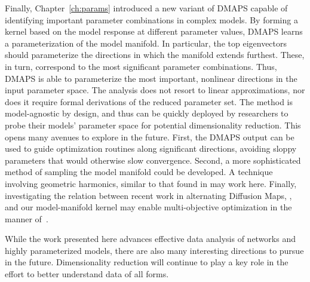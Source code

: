 Finally, Chapter~\ref{ch:params} introduced a new variant of DMAPS
capable of identifying important parameter combinations in complex
models. By forming a kernel based on the model response at different
parameter values, DMAPS learns a parameterization of the model
manifold. In particular, the top eigenvectors should parameterize the
directions in which the manifold extends furthest. These, in turn,
correspond to the most significant parameter combinations. Thus, DMAPS
is able to parameterize the most important, nonlinear directions in
the input parameter space. The analysis does not resort to linear
approximations, nor does it require formal derivations of the reduced
parameter set. The method is model-agnostic by design, and thus can be
quickly deployed by researchers to probe their models' parameter space
for potential dimensionality reduction. This opens many avenues to
explore in the future. First, the DMAPS output can be used to guide
optimization routines along significant directions, avoiding sloppy
parameters that would otherwise slow convergence. Second, a more
sophisticated method of sampling the model manifold could be
developed. A technique involving geometric harmonics, similar to that
found in \cite{chiavazzo_intrinsic_2017} may work here. Finally,
investigating the relation between recent work in alternating
Diffusion Maps, \cite{lederman_learning_2015}, and our model-manifold kernel may
enable multi-objective optimization in the manner of~\cite{marler_survey_2004}.

While the work presented here advances effective data analysis of
networks and highly parameterized models, there are also many
interesting directions to pursue in the future. Dimensionality
reduction will continue to play a key role in the effort to better
understand data of all forms.



